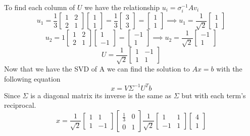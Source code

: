 \documentclass{article}
\begin{document}
To find each column of $U$ we have the relationship $u_i =  \sigma_i^{-1}Av_i$
$$u_1 =
\frac{1}{3}
\begin{bmatrix}
1 & 2 \\
2 & 1
\end{bmatrix}
\begin{bmatrix}
1 \\
1
\end{bmatrix}
=
\frac{1}{3}
\begin{bmatrix}
3 \\
3
\end{bmatrix}
=
\begin{bmatrix}
1 \\
1
\end{bmatrix}
\implies
u_1 =
\frac{1}{\sqrt{2}}
\begin{bmatrix}
1 \\
1
\end{bmatrix}
$$
$$u_2 =
1
\begin{bmatrix}
1 & 2 \\
2 & 1
\end{bmatrix}
\begin{bmatrix}
1 \\
-1
\end{bmatrix}
=
\begin{bmatrix}
-1 \\
1
\end{bmatrix}
\implies
u_2 =
\frac{1}{\sqrt{2}}
\begin{bmatrix}
-1 \\
1
\end{bmatrix}
$$
$$
U =
\frac{1}{\sqrt{2}}
\begin{bmatrix}
1 & -1 \\
1 & 1
\end{bmatrix}
$$
Now that we have the SVD of A we can find the solution to $Ax = b$ with the following equation
$$ x = V \Sigma^{-1}U^Tb $$
Since $\Sigma$ is a diagonal matrix its inverse is the same as $\Sigma$ but with each term's reciprocal.
$$x =
\frac{1}{\sqrt{2}}
\begin{bmatrix}
1 & 1 \\
1 & -1
\end{bmatrix}
\begin{bmatrix}
\frac{1}{3} & 0 \\
0 & 1
\end{bmatrix}
\frac{1}{\sqrt{2}}
\begin{bmatrix}
1 & 1 \\
-1 & 1
\end{bmatrix}
\begin{bmatrix}
4 \\
1
\end{bmatrix}
$$
\end{document}
